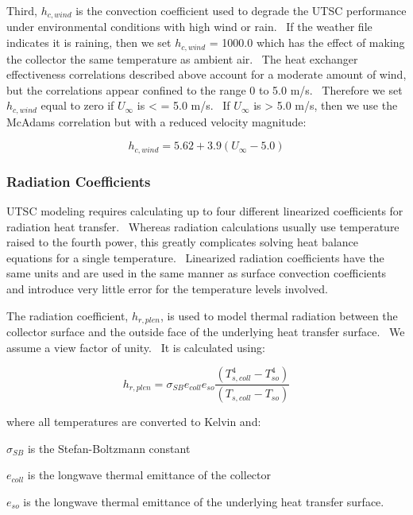 Third, \({h_{c,wind}}\) is the convection coefficient used to degrade the UTSC performance under environmental conditions with high wind or rain.~ If the weather file indicates it is raining, then we set \({h_{c,wind}}\) = 1000.0 which has the effect of making the collector the same temperature as ambient air.~ The heat exchanger effectiveness correlations described above account for a moderate amount of wind, but the correlations appear confined to the range 0 to 5.0 m/s.~ Therefore we set \({h_{c,wind}}\) equal to zero if \({U_\infty }\) is \textless{} = 5.0 m/s.~ If \({U_\infty }\) is \textgreater{} 5.0 m/s, then we use the McAdams correlation but with a reduced velocity magnitude:

\begin{equation}
{h_{c,wind}} = 5.62 + 3.9({U_\infty } - 5.0)
\end{equation}

\subsubsection{Radiation Coefficients}\label{radiation-coefficients-000}

UTSC modeling requires calculating up to four different linearized coefficients for radiation heat transfer.~ Whereas radiation calculations usually use temperature raised to the fourth power, this greatly complicates solving heat balance equations for a single temperature.~ Linearized radiation coefficients have the same units and are used in the same manner as surface convection coefficients and introduce very little error for the temperature levels involved.

The radiation coefficient, \({h_{r,plen}}\), is used to model thermal radiation between the collector surface and the outside face of the underlying heat transfer surface.~ We assume a view factor of unity.~ It is calculated using:

\begin{equation}
{h_{r,plen}} = {\sigma_{SB}}{e_{coll}}{e_{so}}\frac{{\left( {T_{s,coll}^4 - T_{so}^4} \right)}}{{\left( {{T_{s,coll}} - {T_{so}}} \right)}}
\end{equation}

where all temperatures are converted to Kelvin and:

\({\sigma_{SB}}\) is the Stefan-Boltzmann constant

\({e_{coll}}\) is the longwave thermal emittance of the collector

\({e_{so}}\) is the longwave thermal emittance of the underlying heat transfer surface.

